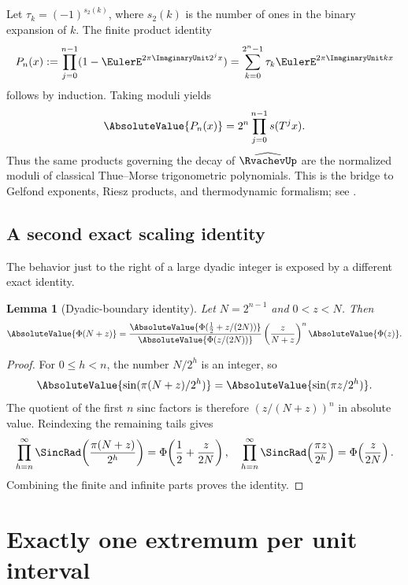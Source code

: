 \documentclass[11pt,oneside]{article}
\newtheorem{lemma}[lemma]{Lemma}
\theoremstyle{definition}
\theoremstyle{remark}
\newcommand{\Phiup}{\Phi}
\begin{document}
Let $\tau_k=(-1)^{s_2(k)}$, where $s_2(k)$ is the number of ones in the binary expansion of
$k$.  The finite product identity
\begin{equation}
 P_n(x):=\prod_{j=0}^{n-1}(1-\EulerE^{2\pi\ImaginaryUnit2^jx})
 =\sum_{k=0}^{2^n-1}\tau_k\EulerE^{2\pi\ImaginaryUnit kx}
 \label{eq:TM-polynomial}
\end{equation}
follows by induction.  Taking moduli yields
\begin{equation}
 \AbsoluteValue{P_n(x)}=2^n\prod_{j=0}^{n-1}s(T^jx).
 \label{eq:TM-modulus}
\end{equation}
Thus the same products governing the decay of $\widehat{\RvachevUp}$ are the normalized moduli of
classical Thue--Morse trigonometric polynomials.  This is the bridge to Gelfond exponents,
Riesz products, and thermodynamic formalism; see \cite{gelfond,queffelec,fan-schmeling-shen}.

\subsection{A second exact scaling identity}
\label{subsec:boundary-identity}

The behavior just to the right of a large dyadic integer is exposed by a different exact
identity.

\begin{lemma}[Dyadic-boundary identity]
\label{lem:dyadic-boundary}
Let $N=2^{n-1}$ and $0<z<N$.  Then
\begin{equation}
 \AbsoluteValue{\Phiup(N+z)}
 =\frac{\AbsoluteValue{\Phiup(\tfrac12+z/(2N))}}
        {\AbsoluteValue{\Phiup(z/(2N))}}
  \left(\frac{z}{N+z}\right)^n\AbsoluteValue{\Phiup(z)}.
 \label{eq:dyadic-boundary}
\end{equation}
\end{lemma}

\begin{proof}
For $0\le h<n$, the number $N/2^h$ is an integer, so
\[
 \AbsoluteValue{\sin(\pi(N+z)/2^h)}=\AbsoluteValue{\sin(\pi z/2^h)}.
\]
The quotient of the first $n$ sinc factors is therefore $(z/(N+z))^n$ in absolute value.
Reindexing the remaining tails gives
\[
 \prod_{h=n}^{\infty}\SincRad\!\left(\frac{\pi(N+z)}{2^h}\right)
 =\Phiup\!\left(\frac12+\frac{z}{2N}\right),
 \quad
 \prod_{h=n}^{\infty}\SincRad\!\left(\frac{\pi z}{2^h}\right)
 =\Phiup\!\left(\frac{z}{2N}\right).
\]
Combining the finite and infinite parts proves the identity.
\end{proof}

\section{Exactly one extremum per unit interval}
\label{sec:extrema}
\end{document}
